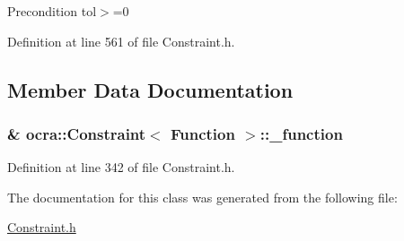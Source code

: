 \begin{DoxyPrecond}{Precondition}
tol$>$=0 
\end{DoxyPrecond}


Definition at line 561 of file Constraint.\+h.



\subsection{Member Data Documentation}
\subsubsection[{\texorpdfstring{\+\_\+function}{_function}}]{\& {\bf ocra\+::\+Constraint}$<$ {\bf Function} $>$\+::\+\_\+function\hspace{0.3cm}{\ttfamily [protected]}}\hypertarget{classocra_1_1Constraint_3_01Function_01_4_a51f8ef2f03da02c092aff7db27b325b6}{}\label{classocra_1_1Constraint_3_01Function_01_4_a51f8ef2f03da02c092aff7db27b325b6}


Definition at line 342 of file Constraint.\+h.



The documentation for this class was generated from the following file\+:\begin{DoxyCompactItemize}
\item 
\hyperlink{Constraint_8h}{Constraint.\+h}\end{DoxyCompactItemize}

